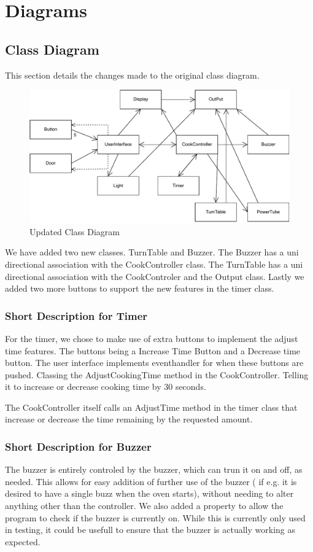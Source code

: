 \section{Diagrams}

\subsection{Class Diagram}
This section details the changes made to the original class diagram.
\begin{figure}[h]
  \centering
  \includegraphics[scale=0.66]{02-Body/Image/ClassDiagram}
  \caption{Updated Class Diagram}%
  \label{fig:ClassDiagram}
\end{figure}
We have added two new classes. TurnTable and Buzzer.
The Buzzer has a uni directional association with the CookController class.
The TurnTable has a uni directional association with the CookControler and the Output class.
Lastly we added two more buttons to support the new features in the timer class.

\subsubsection{Short Description for Timer}
For the timer, we chose to make use of extra buttons to implement the adjust time features.
The buttons being a Increase Time Button and a Decrease time button. The user interface 
implements eventhandler for when these buttons are pushed. Classing the AdjustCookingTime
method in the CookController. Telling it to increase or decrease cooking time by 30 seconds.

The CookController itself calls an AdjustTime method in the timer class that increase or decrease
the time remaining by the requested amount.

\subsubsection{Short Description for Buzzer}
The buzzer is entirely controled by the buzzer, which can trun it on and off, as needed. This allows for easy addition of further use of the buzzer ( if e.g. it is desired to have a single buzz when the oven starts), without needing to alter anything other than the controller. We also added a property to allow the program to check if the buzzer is currently on. While this is currently only used in testing, it could be usefull to ensure that the buzzer is actually working as expected.


